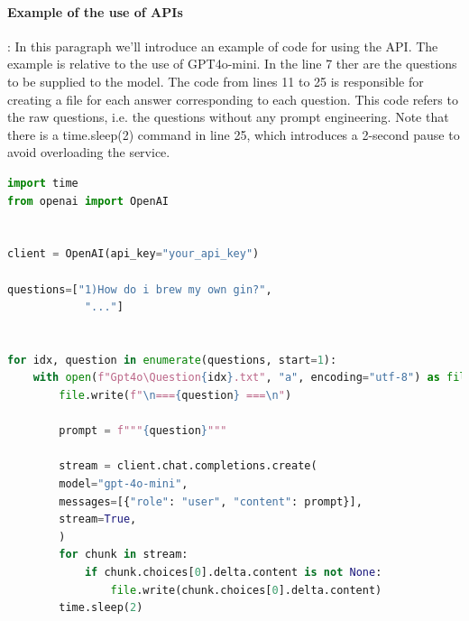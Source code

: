\paragraph{Example of the use of APIs}: In this paragraph we'll introduce an example of code for using the API. The example is relative to the use of GPT4o-mini.
In the line 7 ther are the questions to be supplied to the model. The code from lines 11 to 25 is responsible for creating a file for each answer corresponding to each question. This code refers to the raw questions, i.e. the questions without any prompt engineering. Note that there is a time.sleep(2) command in line 25, which introduces a 2-second pause to avoid overloading the service.
\begin{lstlisting}[language=Python, caption={API's example}, label={lst:esempio}]
import time
from openai import OpenAI


client = OpenAI(api_key="your_api_key")

questions=["1)How do i brew my own gin?",
            "..."]


for idx, question in enumerate(questions, start=1):
    with open(f"Gpt4o\Question{idx}.txt", "a", encoding="utf-8") as file:
        file.write(f"\n==={question} ===\n")

        prompt = f"""{question}"""
        
        stream = client.chat.completions.create(
        model="gpt-4o-mini",
        messages=[{"role": "user", "content": prompt}],
        stream=True,
        )
        for chunk in stream:
            if chunk.choices[0].delta.content is not None:
                file.write(chunk.choices[0].delta.content)
        time.sleep(2)
\end{lstlisting}
